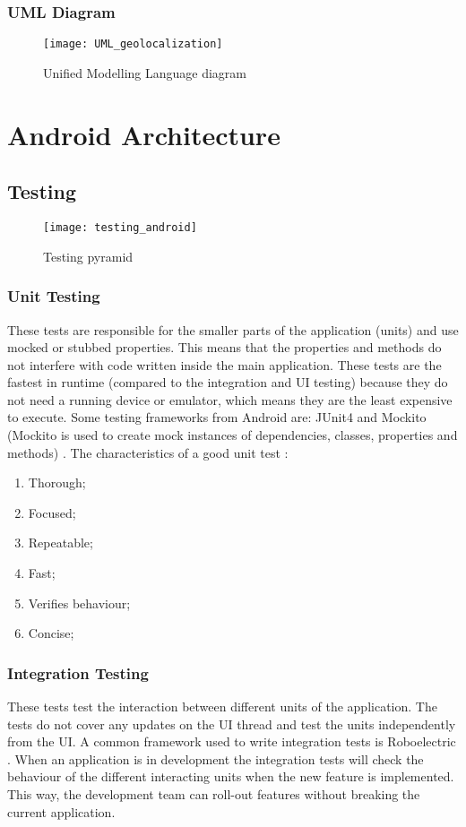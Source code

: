 \subsubsection{UML Diagram}
\begin{landscape}
\begin{figure}[!h]
\centering
\texttt{[image: UML\_geolocalization]}
\caption{Unified Modelling Language diagram}
\end{figure}
\end{landscape}
\section{Android Architecture}
\subsection{Testing}
\cite{Google_testing2017}
\begin{figure}[h!]
\texttt{[image: testing\_android]}
\centering
\caption{Testing pyramid~\cite{FernandoSproviero2018}}
\end{figure}
\subsubsection{Unit Testing}
These tests are responsible for the smaller parts of the application (units) and use mocked or stubbed properties. This means that the properties and methods do not interfere with code written inside the main application. These tests are the fastest in runtime (compared to the integration and UI testing) because they do not need a running device or emulator, which means they are the least expensive to execute. Some testing frameworks from Android are: JUnit4 and Mockito (Mockito is used to create mock instances of dependencies, classes, properties and methods) \cite{FernandoSproviero2018}. The characteristics of a good unit test \cite{Google_testing2017}:
\begin{enumerate}
\item Thorough;
\item Focused;
\item Repeatable;
\item Fast;
\item Verifies behaviour;
\item Concise;
\end{enumerate}
\subsubsection{Integration Testing}
These tests test the interaction between different units of the application. The tests do not cover any updates on the UI thread and test the units independently from the UI. A common framework used to write integration tests is Roboelectric \cite{Roboelec2019}. When an application is in development the integration tests will check the behaviour of the different interacting units when the new feature is implemented. This way, the development team can roll-out features without breaking the current application.

